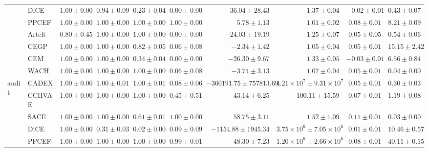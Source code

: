 \begin{table}[ht]
\begin{center}
\begin{sc}
\begin{scriptsize}
\begin{tabular}{l|l|rrrrrrrr}
 & DiCE & $\boldsymbol{1.00\pm{0.00}}$ & $0.94\pm{0.09}$ & $0.23\pm{0.04}$ & $0.00\pm{0.00}$ & $-36.04\pm{28.43}$ & $1.37\pm{0.04}$ & $-0.02\pm{0.01}$ & $0.43\pm{0.07}$ \\
 & PPCEF & $\boldsymbol{1.00\pm{0.00}}$ & $\boldsymbol{1.00\pm{0.00}}$ & $\boldsymbol{1.00\pm{0.00}}$ & $\boldsymbol{1.00\pm{0.00}}$ & $\boldsymbol{5.78\pm{1.13}}$ & $\boldsymbol{1.01\pm{0.02}}$ & $\boldsymbol{0.08\pm{0.01}}$ & $8.21\pm{0.09}$ \\
 & Artelt & $0.80\pm{0.45}$ & $\boldsymbol{1.00\pm{0.00}}$ & $\boldsymbol{1.00\pm{0.00}}$ & $0.00\pm{0.00}$ & $-24.03\pm{19.19}$ & $1.25\pm{0.07}$ & $0.05\pm{0.05}$ & $0.54\pm{0.06}$ \\
 & CEGP & $\boldsymbol{1.00\pm{0.00}}$ & $\boldsymbol{1.00\pm{0.00}}$ & $0.82\pm{0.05}$ & $0.06\pm{0.08}$ & $-2.34\pm{1.42}$ & $1.05\pm{0.04}$ & $0.05\pm{0.01}$ & $15.15\pm{2.42}$ \\
 & CEM & $\boldsymbol{1.00\pm{0.00}}$ & $\boldsymbol{1.00\pm{0.00}}$ & $0.34\pm{0.04}$ & $0.00\pm{0.00}$ & $-26.30\pm{9.67}$ & $1.33\pm{0.05}$ & $-0.03\pm{0.01}$ & $6.56\pm{0.84}$ \\
 & WACH & $\boldsymbol{1.00\pm{0.00}}$ & $\boldsymbol{1.00\pm{0.00}}$ & $\boldsymbol{1.00\pm{0.00}}$ & $0.06\pm{0.08}$ & $-3.74\pm{3.13}$ & $1.07\pm{0.04}$ & $0.05\pm{0.01}$ & $0.04\pm{0.00}$ \\
\midrule
\multirow{9}{*}{audit} & CADEX & $\boldsymbol{1.00\pm{0.00}}$ & $\boldsymbol{1.00\pm{0.01}}$ & $\boldsymbol{1.00\pm{0.01}}$ & $0.08\pm{0.06}$ & $-360191.75\pm{757813.69}$ & $4.21\times 10^{7}\pm{9.31\times 10^{7}}$ & $0.05\pm{0.01}$ & $0.30\pm{0.03}$ \\
 & CCHVAE & $\boldsymbol{1.00\pm{0.00}}$ & $\boldsymbol{1.00\pm{0.00}}$ & $\boldsymbol{1.00\pm{0.00}}$ & $0.45\pm{0.51}$ & $43.14\pm{6.25}$ & $100.11\pm{15.59}$ & $0.07\pm{0.01}$ & $1.19\pm{0.08}$ \\
 & SACE & $\boldsymbol{1.00\pm{0.00}}$ & $\boldsymbol{1.00\pm{0.00}}$ & $0.61\pm{0.01}$ & $\boldsymbol{1.00\pm{0.00}}$ & $\boldsymbol{58.75\pm{3.11}}$ & $\boldsymbol{1.52\pm{1.09}}$ & $\boldsymbol{0.11\pm{0.01}}$ & $\boldsymbol{0.03\pm{0.00}}$ \\
 & DiCE & $\boldsymbol{1.00\pm{0.00}}$ & $0.31\pm{0.03}$ & $0.02\pm{0.00}$ & $0.09\pm{0.09}$ & $-1154.88\pm{1945.34}$ & $3.75\times 10^{6}\pm{7.05\times 10^{6}}$ & $0.01\pm{0.01}$ & $10.46\pm{0.57}$ \\
 & PPCEF & $\boldsymbol{1.00\pm{0.00}}$ & $\boldsymbol{1.00\pm{0.00}}$ & $\boldsymbol{1.00\pm{0.00}}$ & $0.99\pm{0.01}$ & $48.30\pm{7.23}$ & $1.20\times 10^{6}\pm{2.66\times 10^{6}}$ & $0.08\pm{0.01}$ & $40.11\pm{0.15}$ \\

\end{tabular}
\end{scriptsize}
\end{sc}
\end{center}
\end{table}

